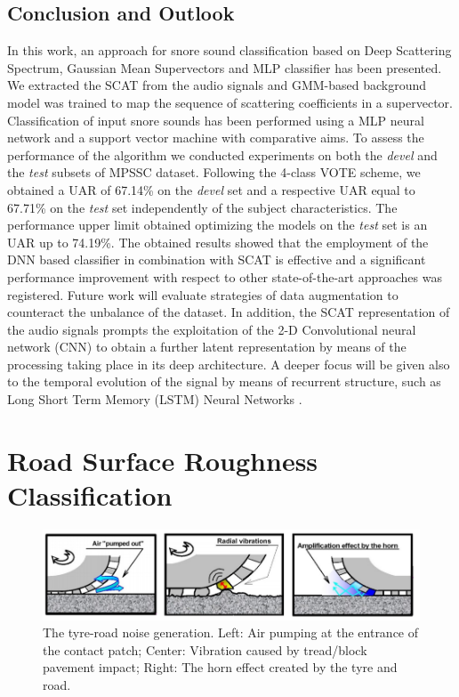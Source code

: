 \subsection{Conclusion and Outlook}
\label{section:concl}

In this work, an approach for snore sound classification based on Deep Scattering Spectrum, Gaussian Mean Supervectors and MLP classifier has been presented. We extracted the SCAT from the audio signals and GMM-based background model was trained to map the sequence of scattering coefficients in a supervector. Classification of input snore sounds has been performed using a MLP neural network and a support vector machine with comparative aims. To assess the performance of the algorithm we conducted experiments on both the \textit{devel} and the \textit{test} subsets of MPSSC dataset.
Following the 4-class VOTE scheme, we obtained a UAR of 67.14\% on the \textit{devel} set and a respective UAR equal to 67.71\% on the \textit{test} set independently of the subject characteristics. 
The performance upper limit obtained optimizing the models on the \textit{test} set is an UAR up to 74.19\%.
The obtained results showed that the employment of the DNN based classifier in combination with SCAT is effective and a significant performance improvement with respect to other state-of-the-art approaches was registered. 
Future work will evaluate strategies of data augmentation to counteract the unbalance of the dataset. In addition, the SCAT representation of the audio signals prompts the exploitation of the 2-D Convolutional neural network (CNN) to obtain a further latent representation by means of the processing taking place in its deep architecture.
A deeper focus will be given also to the temporal evolution of the signal by means of recurrent structure, such as Long Short Term Memory (LSTM) Neural Networks \cite{graves2005framewise}. 
\newpage






\section{Road Surface Roughness Classification}
	
	\begin{figure}[h]
		\centering
		\includegraphics[width=\textwidth]{img/pompaevibrazionihorn.png}
		\caption[Tyre-Road Noises]{The tyre-road noise generation. Left:  Air pumping at the entrance of the contact patch; Center: Vibration caused by tread/block pavement impact; Right: The horn effect created by the tyre and road.}
		\label{fig:tyre-road-noise}
	\end{figure}
	
